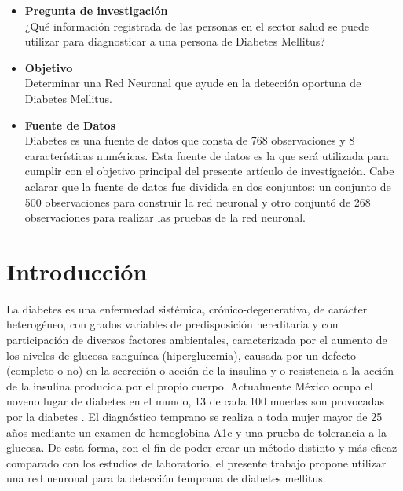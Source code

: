 \documentclass[letterpaper, 10 pt, conference]{ieeeconf}
\begin{document}
\begin{itemize}[leftmargin=*]
    \item \textbf{Pregunta de investigación}
    \\¿Qué información registrada de las personas en el sector salud se puede utilizar para diagnosticar a una persona de Diabetes Mellitus?\\
    
    \item \textbf{Objetivo}
    \\Determinar una Red Neuronal que ayude en la detección oportuna de Diabetes Mellitus.\\

    \item \textbf{Fuente de Datos}
    \\Diabetes \cite{dataset:2019} es una fuente de datos que consta de 768 observaciones y 8 características numéricas. Esta fuente de datos es la que será utilizada para cumplir con el objetivo principal del presente artículo de investigación. Cabe aclarar que la fuente de datos fue dividida en dos conjuntos: un conjunto de 500 observaciones para construir la red neuronal y otro conjuntó de 268 observaciones para realizar las pruebas de la red neuronal.\\
\end{itemize}

\section{Introducción}

La diabetes es una enfermedad sistémica, crónico-degenerativa, de carácter heterogéneo, con grados variables de predisposición hereditaria y con participación de diversos factores ambientales, caracterizada por el aumento de los niveles de glucosa sanguínea (hiperglucemia), causada por un defecto (completo o no) en la secreción o acción de la insulina y o resistencia a la acción de la insulina producida por el propio cuerpo. Actualmente México ocupa el noveno lugar de diabetes en el mundo, 13 de cada 100 muertes son provocadas por la diabetes \cite{2}. El diagnóstico temprano se realiza a toda mujer mayor de 25 años mediante un  examen de hemoglobina A1c y una prueba de tolerancia a la glucosa. De esta forma, con el fin de poder crear un método distinto y más eficaz comparado con los estudios de laboratorio, el presente trabajo propone utilizar una red neuronal para la detección temprana de diabetes mellitus.\\
\end{document}
